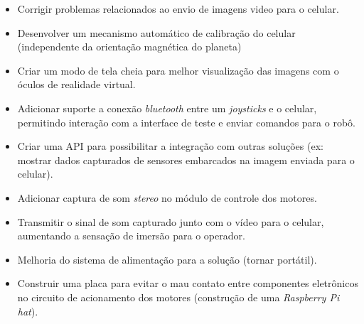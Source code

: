\begin{itemize}
\item Corrigir problemas relacionados ao envio de imagens video para o celular.
\item Desenvolver um mecanismo automático de calibração do celular (independente da orientação magnética do planeta)
\item Criar um modo de tela cheia para melhor visualização das imagens com o óculos de realidade virtual.
\item Adicionar suporte a conexão \textit{bluetooth} entre um \textit{joysticks} e o celular, permitindo interação com a interface de teste e enviar comandos para o robô.
\item Criar uma API para possibilitar a integração com outras soluções (ex: mostrar dados capturados de sensores embarcados na imagem enviada para o celular).
\item Adicionar captura de som \textit{stereo} no módulo de controle dos motores.
\item Transmitir o sinal de som capturado junto com o vídeo para o celular, aumentando a sensação de imersão para o operador.
\item Melhoria do sistema de alimentação para a solução (tornar portátil).
\item Construir uma placa para evitar o mau contato entre componentes eletrônicos no circuito de acionamento dos motores (construção de uma \textit{Raspberry Pi hat}).
\end{itemize}
